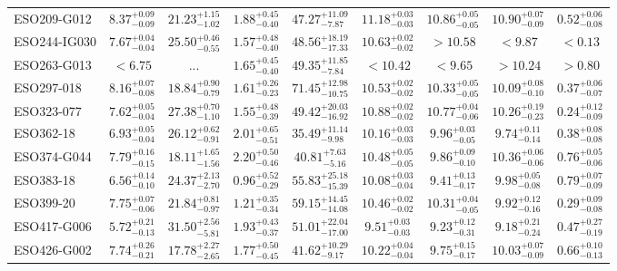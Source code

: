 \documentclass[onecolumn]{mn2e}
\begin{document}
{\begin{center}
\begin{longtable}{lcccccccc}
ESO209-G012 & $8.37_{-0.09}^{+0.09}$ & $21.23_{-1.02}^{+1.15}$ & $1.88_{-0.40}^{+0.45}$ &$47.27_{-7.87}^{+11.09}$ & $11.18_{-0.03}^{+0.03}$ & $10.86_{-0.05}^{+0.05}$ & $10.90_{-0.09}^{+0.07}$ & $0.52_{-0.08}^{+0.06}$ \\
ESO244-IG030 & $7.67_{-0.04}^{+0.04}$ & $25.50_{-0.55}^{+0.46}$ & $1.57_{-0.40}^{+0.48}$ &$48.56_{-17.33}^{+18.19}$ & $10.63_{-0.02}^{+0.02}$ & $>10.58$ & $<9.87$ & $<0.13$ \\
ESO263-G013 & $<6.75$ & ... & $1.65_{-0.40}^{+0.45}$ &$49.35_{-7.84}^{+11.85}$ & $<10.42$ & $<9.65$ & $>10.24$ & $>0.80$ \\
ESO297-018 & $8.16_{-0.08}^{+0.07}$ & $18.84_{-0.79}^{+0.90}$ & $1.61_{-0.23}^{+0.26}$ &$71.45_{-10.75}^{+12.98}$ & $10.53_{-0.02}^{+0.02}$ & $10.33_{-0.05}^{+0.05}$ & $10.09_{-0.10}^{+0.08}$ & $0.37_{-0.07}^{+0.06}$ \\
ESO323-077 & $7.62_{-0.04}^{+0.05}$ & $27.38_{-1.10}^{+0.70}$ & $1.55_{-0.39}^{+0.48}$ &$49.42_{-16.92}^{+20.03}$ & $10.88_{-0.02}^{+0.02}$ & $10.77_{-0.06}^{+0.04}$ & $10.26_{-0.23}^{+0.19}$ & $0.24_{-0.09}^{+0.12}$ \\
ESO362-18 & $6.93_{-0.04}^{+0.05}$ & $26.12_{-0.91}^{+0.62}$ & $2.01_{-0.51}^{+0.65}$ &$35.49_{-9.98}^{+11.14}$ & $10.16_{-0.03}^{+0.03}$ & $9.96_{-0.05}^{+0.03}$ & $9.74_{-0.14}^{+0.11}$ & $0.38_{-0.08}^{+0.08}$ \\
ESO374-G044 & $7.79_{-0.15}^{+0.16}$ & $18.11_{-1.56}^{+1.65}$ & $2.20_{-0.46}^{+0.50}$ &$40.81_{-5.16}^{+7.63}$ & $10.48_{-0.05}^{+0.05}$ & $9.86_{-0.10}^{+0.09}$ & $10.36_{-0.06}^{+0.06}$ & $0.76_{-0.06}^{+0.05}$ \\
ESO383-18 & $6.56_{-0.10}^{+0.14}$ & $24.37_{-2.70}^{+2.13}$ & $0.96_{-0.29}^{+0.52}$ &$55.83_{-15.39}^{+25.18}$ & $10.08_{-0.04}^{+0.03}$ & $9.41_{-0.17}^{+0.13}$ & $9.98_{-0.08}^{+0.05}$ & $0.79_{-0.09}^{+0.07}$ \\
ESO399-20 & $7.75_{-0.06}^{+0.07}$ & $21.84_{-0.97}^{+0.81}$ & $1.21_{-0.34}^{+0.35}$ &$59.15_{-14.08}^{+14.45}$ & $10.46_{-0.02}^{+0.02}$ & $10.31_{-0.05}^{+0.04}$ & $9.92_{-0.16}^{+0.12}$ & $0.29_{-0.08}^{+0.09}$ \\
ESO417-G006 & $5.72_{-0.13}^{+0.21}$ & $31.50_{-5.81}^{+2.56}$ & $1.93_{-0.37}^{+0.43}$ &$51.01_{-17.00}^{+22.04}$ & $9.51_{-0.03}^{+0.03}$ & $9.23_{-0.31}^{+0.12}$ & $9.18_{-0.24}^{+0.21}$ & $0.47_{-0.19}^{+0.27}$ \\
ESO426-G002 & $7.74_{-0.21}^{+0.26}$ & $17.78_{-2.65}^{+2.27}$ & $1.77_{-0.45}^{+0.50}$ &$41.62_{-9.17}^{+10.29}$ & $10.22_{-0.04}^{+0.04}$ & $9.75_{-0.17}^{+0.15}$ & $10.03_{-0.09}^{+0.07}$ & $0.66_{-0.13}^{+0.10}$ \\

\end{longtable}
\end{center}}
\end{document}
